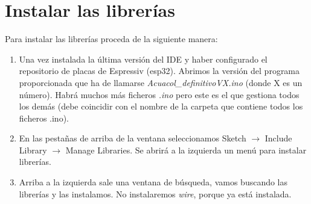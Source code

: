\section{Instalar las librerías}

Para instalar las librerías proceda de la siguiente manera:

\begin{enumerate}
\item Una vez instalada la última versión del IDE y haber configurado el repositorio de placas de Espressiv (esp32). Abrimos la versión del programa proporcionada que ha de llamarse \emph{Acuacol\_definitivoVX.ino} (donde X es un número). Habrá muchos más ficheros \emph{.ino} pero este es el que gestiona todos los demás (debe coincidir con el nombre de la carpeta que contiene todos los ficheros .ino).
\item En las pestañas de arriba de la ventana seleccionamos Sketch $\rightarrow$ Include Library $\rightarrow$ Manage Libraries. Se abrirá a la izquierda un menú para instalar librerías.
\item Arriba a la izquierda sale una ventana de búsqueda, vamos buscando las librerías y las instalamos. No instalaremos \emph{wire}, porque ya está instalada.
\end{enumerate}

